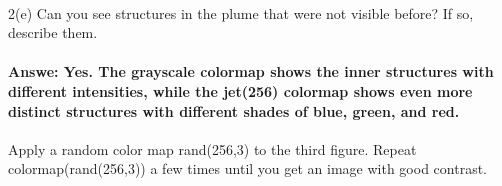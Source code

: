 \documentclass[11pt]{article}
\begin{document}
    \begin{center}
    \end{center}
    { \hspace*{\fill} \\}
    
    2(e) Can you see structures in the plume that were not visible before?
If so, describe them.

\hypertarget{answe-yes.-the-grayscale-colormap-shows-the-inner-structures-with-different-intensities-while-the-jet256-colormap-shows-even-more-distinct-structures-with-different-shades-of-blue-green-and-red.}{%
\paragraph{Answe: Yes. The grayscale colormap shows the inner structures
with different intensities, while the jet(256) colormap shows even more
distinct structures with different shades of blue, green, and
red.}\label{answe-yes.-the-grayscale-colormap-shows-the-inner-structures-with-different-intensities-while-the-jet256-colormap-shows-even-more-distinct-structures-with-different-shades-of-blue-green-and-red.}}

Apply a random color map rand(256,3) to the third figure. Repeat
colormap(rand(256,3)) a few times until you get an image with good
contrast.
\end{document}
